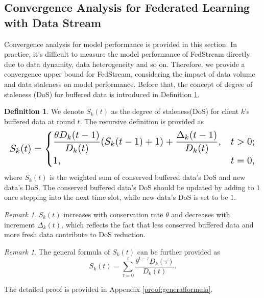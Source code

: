 \documentclass{article}
\theoremstyle{plain}
\theoremstyle{definition}
\newtheorem{definition}[theorem]{Definition}
\theoremstyle{remark}
\newtheorem{remark}[theorem]{Remark}
\begin{document}
\subsection{Convergence Analysis for Federated Learning with Data Stream}
Convergence analysis for model performance is provided in this section.
In practice, it's difficult to measure the model performance of FedStream directly due to data dynamity, data heterogeneity and so on.
Therefore, we provide a convergence upper bound for FedStream, considering the impact of data volume and data staleness on model performance.
Before that, the concept of degree of staleness (DoS) for buffered data is introduced in Definition \ref{definition:1}.
\begin{definition}
  \label{definition:1}
  We denote $S_k(t)$ as the degree of staleness(DoS) for client $k$'s buffered data at round $t$. The recursive definition is provided as 
  \begin{equation}
    \resizebox{\columnwidth}{!}{$
      S_k(t) = 
      \begin{cases}
        \dfrac{\theta D_k(t-1)}{D_k(t)}(S_k(t-1) + 1) + \dfrac{\Delta_k(t-1)}{D_k(t)}, & t > 0; \\
        1, & t = 0,
      \end{cases}
    $}
  \end{equation}
  where $S_k(t)$ is the weighted sum of conserved buffered data's DoS and new data's DoS.
  The conserved buffered data's DoS should be updated by adding to $1$ once stepping into the next time slot, while new data's DoS is set to be $1$.
\end{definition}

\begin{remark}
  $S_k(t)$ increases with conservation rate $\theta$ and decreases with increment $\Delta_k(t)$, which reflects the fact that less conserved buffered data and more fresh data contribute to DoS reduction.
\end{remark}
\begin{remark}
  \label{remark:generalformula}
  The general formula of $S_k(t)$ can be further provided as
  \begin{equation}
    S_k(t) = \sum_{\tau=0}^{t} \frac{\theta^{t-\tau} D_k(\tau)}{D_k(t)}.    
  \end{equation}
\end{remark}
The detailed proof is provided in Appendix \ref{proof:generalformula}.
\end{document}
